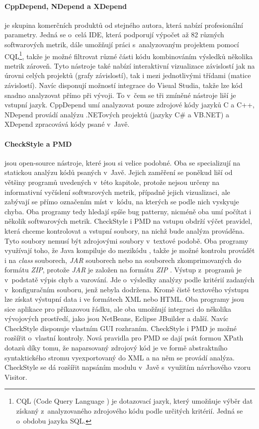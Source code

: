 \documentclass[11pt,twoside,a4paper]{book}
\begin{document}
\paragraph{CppDepend, NDepend a XDepend}\cite{CppDepend,NDepend,XDepend} je skupina komerčních produktů od stejného autora, která nabízí profesionální parametry.
Jedná se o~celá IDE, která podporují výpočet až 82 různých softwarových metrik, dále umožňují práci s~analyzovaným projektem
pomocí CQL\footnote{CQL (Code Query Language \cite{CQL}) je dotazovací jazyk, který umožňuje výběr dat získaný
z~analyzovaného zdrojového kódu podle určitých kritérií. Jedná se o~obdobu jazyka SQL.}, takže je možné filtrovat různé
části kódu kombinováním výsledků několika metrik zároveň. Tyto nástroje také nabízí interaktivní vizualizace závislostí jak na úrovni celých
projektů (grafy závislostí), tak i mezi jednotlivými třídami (matice závislostí). Navíc disponují možností integrace do Visual Studia,
takže lze kód snadno analyzovat přímo při vývoji. To v~čem se tři zmíněné nástroje liší je vstupní jazyk. CppDepend umí analyzovat pouze
zdrojové kódy jazyků C a C++, NDepend provádí analýzu .NETových projektů (jazyky C\# a VB.NET) a XDepend zpracovává kódy psané v~Javě.

\paragraph{CheckStyle \cite{CheckStyle} a PMD \cite{PMD}} jsou open-source nástroje, které jsou si velice podobné. Oba se specializují na statickou
analýzu kódů psaných v~Javě. Jejich zaměření se poněkud liší od většiny programů uvedených v~této kapitole, protože nejsou určeny
na informativní vyčíslení softwarových metrik, případně jejich vizualizaci, ale zabývají se přímo označením míst v~kódu, na kterých se
podle nich vyskyuje chyba. Oba programy tedy hledají spíše bug patterny, nicméně oba umí počítat i několik softwarových metrik.
CheckStyle i PMD na vstupu obdrží výčet pravidel, která chceme kontrolovat a vstupní soubory, na nichž bude analýza prováděna.
Tyto soubory nemusí být zdrojovými soubory v~textové podobě. Oba programy využívají toho, že Java kompiluje do mezikódu \cite{JAVABYTECODE}, takže je možné
kontrolu provádět i na \textit{class} souborech, \textit{JAR} souborech nebo na souborech zkomprimovaných do formátu \textit{ZIP},
protože \textit{JAR} je založen na formátu \textit{ZIP} \cite{JARZIP}.
Výstup z~programů je v~podstatě výpis chyb a varování. Jde o~výsledky analýzy podle kritérií zadaných v~konfiguračním souboru, jenž nebyla dodržena.
Kromě čistě textového výstupu lze získat výstupní data i ve formátech XML nebo HTML.
Oba programy jsou sice aplikace pro příkazovou řádku, ale oba umožňují integraci do několika vývojových prostředí, jako jsou NetBeans, Eclipse
JBuilder a další. Navíc CheckStyle disponuje vlastním GUI rozhraním.
CheckStyle i PMD je možné rozšířit o~vlastní kontroly. Nová pravidla pro PMD se dají psát formou XPath dotazů díky tomu, že naparsovaný
zdrojový kód je ve formě abstraktního syntaktického stromu vyexportovaný do XML a na něm se provádí analýza.
CheckStyle se dá rozšířit napsáním modulu v~Javě s~využitím návrhového vzoru Visitor.
\end{document}
